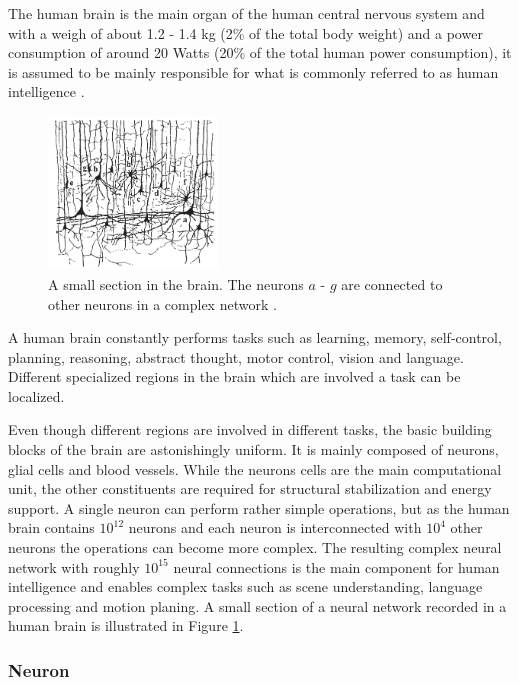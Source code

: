 The human brain is the main organ of the human central nervous system and with a weigh of about 1.2 - 1.4 kg (2\% of the total body weight) and a power consumption of around 20 Watts (20\% of the total human power consumption), it is assumed to be mainly responsible for what is commonly referred to as human intelligence \cite{gerstner2014neuronal}\cite{Byrne1997}.  

\begin{figure}
	\centering
    	\includegraphics[width=0.4\textwidth]{imgs/brain.png} 
    \caption[A small section in the brain.]{A small section in the brain. The neurons $a$ - $g$ are connected to other neurons in a complex network \cite{gerstner2014neuronal}.}
	\label{fig:brain}
\end{figure}

A human brain constantly performs tasks such as learning, memory, self-control, planning, reasoning, abstract thought, motor control, vision and language.
Different specialized regions in the brain which are involved a task can be localized. 

Even though different regions are involved in different tasks, the basic building blocks of the brain are astonishingly uniform. 
It is mainly composed of neurons, glial cells and blood vessels.
While the neurons cells are the main computational unit, the other constituents are required for structural stabilization and energy support.
A single neuron can perform rather simple operations, but as the human brain contains $10^{12}$ neurons and each neuron is interconnected with $10^{4}$ other neurons the operations can become more complex.
The resulting complex neural network with roughly $10^{15}$ neural connections is the main component for human intelligence and enables complex tasks such as scene understanding, language processing and motion planing. A small section of a neural network recorded in a human brain is illustrated in Figure \ref{fig:brain}. 

\subsubsection{Neuron} \label{c:natneuron}


